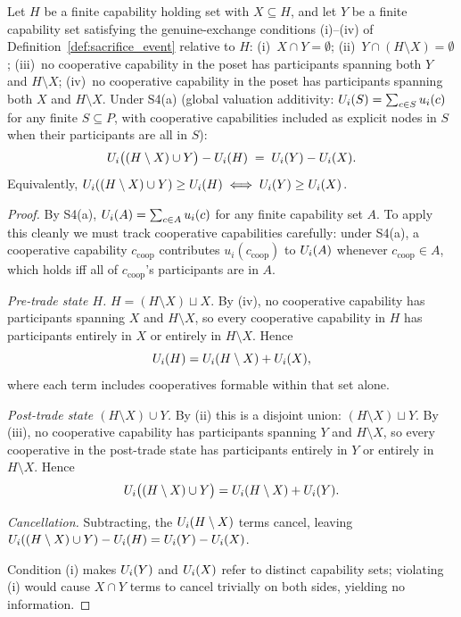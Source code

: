 \begin{lemma}
\label{lem:cancellation}
Let $H$ be a finite capability holding set with $X \subseteq H$,
and let $Y$ be a finite capability set satisfying the
genuine-exchange conditions (i)--(iv) of
Definition~\ref{def:sacrifice_event} relative to $H$:
(i)~$X \cap Y = \emptyset$;
(ii)~$Y \cap (H \setminus X) = \emptyset$;
(iii)~no cooperative capability in the poset has participants
spanning both $Y$ and $H \setminus X$;
(iv)~no cooperative capability in the poset has participants
spanning both $X$ and $H \setminus X$.
Under S4(a) (global valuation additivity:
$U_i(S) = \sum_{c \in S} u_i(c)$ for any finite
$S \subseteq P$, with cooperative capabilities included as
explicit nodes in $S$ when their participants are all in $S$):
\[
  U_i\bigl((H \setminus X) \cup Y\bigr) - U_i(H)
  \;=\; U_i(Y) - U_i(X).
\]
Equivalently,
$U_i((H \setminus X) \cup Y) \geq U_i(H)
\iff U_i(Y) \geq U_i(X)$.
\end{lemma}

\begin{proof}
By S4(a), $U_i(A) = \sum_{c \in A} u_i(c)$ for any finite
capability set $A$.  To apply this cleanly we must track
cooperative capabilities carefully: under S4(a), a cooperative
capability $c_{\mathrm{coop}}$ contributes $u_i(c_{\mathrm{coop}})$
to $U_i(A)$ whenever $c_{\mathrm{coop}} \in A$, which holds iff
all of $c_{\mathrm{coop}}$'s participants are in $A$.

\emph{Pre-trade state $H$.}  $H = (H \setminus X) \sqcup X$.
By (iv), no cooperative capability has participants spanning
$X$ and $H \setminus X$, so every cooperative capability in $H$
has participants entirely in $X$ or entirely in $H \setminus X$.
Hence
\[
  U_i(H) = U_i(H \setminus X) + U_i(X),
\]
where each term includes cooperatives formable within that set
alone.

\emph{Post-trade state $(H \setminus X) \cup Y$.}  By (ii) this
is a disjoint union: $(H \setminus X) \sqcup Y$.  By (iii),
no cooperative capability has participants spanning $Y$ and
$H \setminus X$, so every cooperative in the post-trade state
has participants entirely in $Y$ or entirely in $H \setminus X$.
Hence
\[
  U_i\bigl((H \setminus X) \cup Y\bigr)
  = U_i(H \setminus X) + U_i(Y).
\]

\emph{Cancellation.}
Subtracting, the $U_i(H \setminus X)$ terms cancel, leaving
$U_i((H \setminus X) \cup Y) - U_i(H) = U_i(Y) - U_i(X)$.

Condition (i) makes $U_i(Y)$ and $U_i(X)$ refer to distinct
capability sets; violating (i) would cause $X \cap Y$ terms to
cancel trivially on both sides, yielding no information.
\end{proof}

